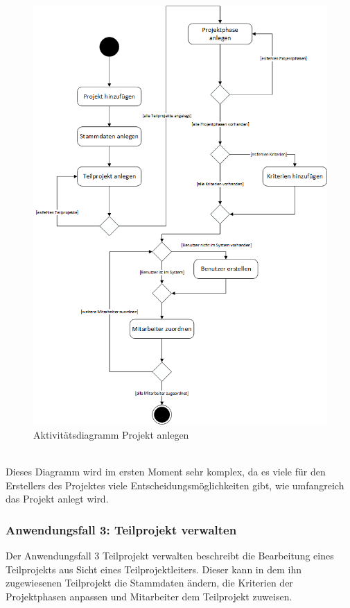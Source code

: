 \begin{figure}[h!]
    \centering
    \includegraphics[scale=0.67]{./Bilder/AD2_ProjektAnlegen.png}
    \caption[Aktivitätsdiagramm Anwendungsfall 2]{Aktivitätsdiagramm Projekt anlegen}
    \label{fig:AD2}
\end{figure}
\\Dieses Diagramm wird im ersten Moment sehr komplex, da es viele für den Erstellers des Projektes viele Entscheidungsmöglichkeiten gibt, wie umfangreich das Projekt anlegt wird. 

\newpage
\subsubsection{Anwendungsfall 3: Teilprojekt verwalten}
Der Anwendungsfall 3 \glqq{}Teilprojekt verwalten\grqq{} beschreibt die Bearbeitung eines Teilprojekts aus Sicht eines Teilprojektleiters. Dieser kann in dem ihn zugewiesenen Teilprojekt die Stammdaten ändern, die Kriterien der Projektphasen anpassen und Mitarbeiter dem Teilprojekt zuweisen.\\

